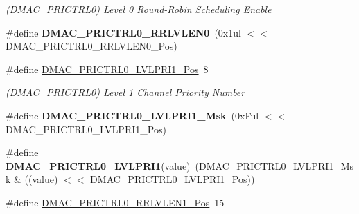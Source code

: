 \begin{DoxyCompactItemize}
\begin{DoxyCompactList}\small\item\em (D\+M\+A\+C\+\_\+\+P\+R\+I\+C\+T\+R\+L0) Level 0 Round-\/\+Robin Scheduling Enable \end{DoxyCompactList}\item 
\hypertarget{group___s_a_m_l21___d_m_a_c_ga0adbe19aec71704ee6aa80bf71784587}{}\#define {\bfseries D\+M\+A\+C\+\_\+\+P\+R\+I\+C\+T\+R\+L0\+\_\+\+R\+R\+L\+V\+L\+E\+N0}~(0x1ul $<$$<$ D\+M\+A\+C\+\_\+\+P\+R\+I\+C\+T\+R\+L0\+\_\+\+R\+R\+L\+V\+L\+E\+N0\+\_\+\+Pos)\label{group___s_a_m_l21___d_m_a_c_ga0adbe19aec71704ee6aa80bf71784587}

\item 
\hypertarget{group___s_a_m_l21___d_m_a_c_gaef400b994eb6155718b5ee3404bdec85}{}\#define \hyperlink{group___s_a_m_l21___d_m_a_c_gaef400b994eb6155718b5ee3404bdec85}{D\+M\+A\+C\+\_\+\+P\+R\+I\+C\+T\+R\+L0\+\_\+\+L\+V\+L\+P\+R\+I1\+\_\+\+Pos}~8\label{group___s_a_m_l21___d_m_a_c_gaef400b994eb6155718b5ee3404bdec85}

\begin{DoxyCompactList}\small\item\em (D\+M\+A\+C\+\_\+\+P\+R\+I\+C\+T\+R\+L0) Level 1 Channel Priority Number \end{DoxyCompactList}\item 
\hypertarget{group___s_a_m_l21___d_m_a_c_ga41f4c8a5ce27da86865c9257841478c3}{}\#define {\bfseries D\+M\+A\+C\+\_\+\+P\+R\+I\+C\+T\+R\+L0\+\_\+\+L\+V\+L\+P\+R\+I1\+\_\+\+Msk}~(0x\+Ful $<$$<$ D\+M\+A\+C\+\_\+\+P\+R\+I\+C\+T\+R\+L0\+\_\+\+L\+V\+L\+P\+R\+I1\+\_\+\+Pos)\label{group___s_a_m_l21___d_m_a_c_ga41f4c8a5ce27da86865c9257841478c3}

\item 
\hypertarget{group___s_a_m_l21___d_m_a_c_gadd0fdd5f864378d5247ddeebcd982769}{}\#define {\bfseries D\+M\+A\+C\+\_\+\+P\+R\+I\+C\+T\+R\+L0\+\_\+\+L\+V\+L\+P\+R\+I1}(value)~(D\+M\+A\+C\+\_\+\+P\+R\+I\+C\+T\+R\+L0\+\_\+\+L\+V\+L\+P\+R\+I1\+\_\+\+Msk \& ((value) $<$$<$ \hyperlink{group___s_a_m_l21___d_m_a_c_gaef400b994eb6155718b5ee3404bdec85}{D\+M\+A\+C\+\_\+\+P\+R\+I\+C\+T\+R\+L0\+\_\+\+L\+V\+L\+P\+R\+I1\+\_\+\+Pos}))\label{group___s_a_m_l21___d_m_a_c_gadd0fdd5f864378d5247ddeebcd982769}

\item 
\hypertarget{group___s_a_m_l21___d_m_a_c_ga10e207b27ae6d334c3edc83fae43ef2b}{}\#define \hyperlink{group___s_a_m_l21___d_m_a_c_ga10e207b27ae6d334c3edc83fae43ef2b}{D\+M\+A\+C\+\_\+\+P\+R\+I\+C\+T\+R\+L0\+\_\+\+R\+R\+L\+V\+L\+E\+N1\+\_\+\+Pos}~15\label{group___s_a_m_l21___d_m_a_c_ga10e207b27ae6d334c3edc83fae43ef2b}


\end{DoxyCompactItemize}
